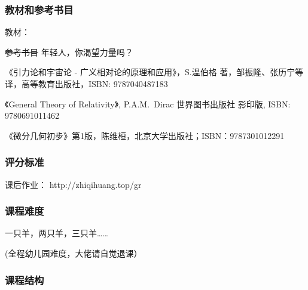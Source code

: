 \documentclass[CJK,13pt]{beamer}
\date{}
\begin{document}
  \bch
{}


\begin{frame}
\frametitle{教材和参考书目}

教材：

\skiplines

\sout{参考书目} 年轻人，你渴望力量吗？
\bitem
\item{《引力论和宇宙论 - 广义相对论的原理和应用》，S.温伯格 著，邹振隆、张历宁等 译，高等教育出版社，ISBN: 9787040487183}
\item{《General Theory of Relativity》, P.A.M.~Dirac 世界图书出版社 影印版, ISBN: 9780691011462}
\item{《微分几何初步》第1版，陈维桓，北京大学出版社；ISBN：9787301012291}
\eitem
      
\end{frame}




\begin{frame}
\frametitle{评分标准}


\skipline

课后作业： http://zhiqihuang.top/gr

\end{frame}




\begin{frame}
  \frametitle{课程难度}

      

  一只羊，两只羊，三只羊……


  \skiplines
  
  (全程幼儿园难度，大佬请自觉退课）
  
\end{frame}


\begin{frame}
  \frametitle{课程结构}
\end{frame}

\ech
\end{document}
